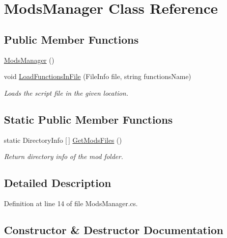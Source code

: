 \hypertarget{class_mods_manager}{}\section{Mods\+Manager Class Reference}
\label{class_mods_manager}
\subsection*{Public Member Functions}
\begin{DoxyCompactItemize}
\item 
\hyperlink{class_mods_manager_ac629714e5655a819f3809976ac2cfecf}{Mods\+Manager} ()
\item 
void \hyperlink{class_mods_manager_a6c8466dcd3758a6261c2a1778d09377d}{Load\+Functions\+In\+File} (File\+Info file, string functions\+Name)
\begin{DoxyCompactList}\small\item\em Loads the script file in the given location. \end{DoxyCompactList}\end{DoxyCompactItemize}
\subsection*{Static Public Member Functions}
\begin{DoxyCompactItemize}
\item 
static Directory\+Info \mbox{[}$\,$\mbox{]} \hyperlink{class_mods_manager_aa4744c5ca479dbb289c489fadcae0f4e}{Get\+Mods\+Files} ()
\begin{DoxyCompactList}\small\item\em Return directory info of the mod folder. \end{DoxyCompactList}\end{DoxyCompactItemize}


\subsection{Detailed Description}


Definition at line 14 of file Mods\+Manager.\+cs.



\subsection{Constructor \& Destructor Documentation}
\mbox{\label{class_mods_manager_ac629714e5655a819f3809976ac2cfecf}} 
